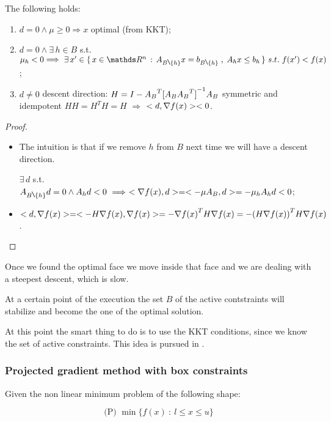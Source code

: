 \documentclass[ComputationalMathematics.tex]{subfiles}
\begin{document}
\begin{proposition}
The following holds:
\begin{enumerate}
  \item $d = 0 \wedge \mu \geq 0 \Longrightarrow x$ optimal (from KKT);
  \item $d = 0 \wedge \exists \, h \in B$ s.t.~$\mu_h < 0 \Longrightarrow~\exists \, x' \in \{ \, x \in \R^n \,:\, A_{B \setminus \{ h \}}x = b_{B \setminus \{ h \}} \;,\; A_h x \leq b_h \, \}~s.t.~f(x') < f(x)$;
  \item $d \neq 0$ descent direction:  $H = I - {A_B}^{T} {[A_B {A_B}^{T}]}^{-1} A_B$ symmetric and idempotent $H H = H^T H = H$ $\Longrightarrow$ $<d, \nabla f(x)>< 0$.
\end{enumerate}
\end{proposition}

\begin{proof}~\\
  \begin{itemize}
    \item The intuition is that if we remove $h$ from $B$ next time we will have a descent direction.
      
      $\exists \, d$ s.t.~$A_{B \setminus \{ h \}}d = 0 \wedge
       A_h d < 0~\Longrightarrow~\ps{\nabla f(x)}{d} = \ps{- \mu A_B}{d} = - \mu_h A_h d < 0$;
     \item $<d, \nabla f(x)> = <- H \nabla f(x), \nabla f(x)> = - \nabla {f(x)}^{T} H \nabla f(x) = - {(H \nabla f(x))}^{T} H \nabla f(x)$.
  \end{itemize}
\end{proof}

Once we found the optimal face we move inside that face and we are dealing with a steepest descent, which is slow.

At a certain point of the execution the set $B$ of the active contstraints will stabilize and become the one of the optimal solution.

At this point the smart thing to do is to use the KKT conditions, since we know the set of active constraints. This idea is pursued in .

\subsubsection{Projected gradient method with box constraints}
Given the non linear minimum problem of the following shape:

\[
  \text{(P) } \min \bigg \{f(x)~:~l \leq x \leq u \bigg \}
\]
\end{document}
